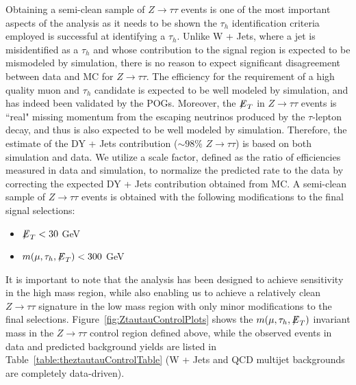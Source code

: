 Obtaining a semi-clean sample of $Z\to\tau\tau$ events is one of the most important aspects of the analysis as it needs to be shown the $\tau_{h}$ identification 
criteria employed is successful at identifying a $\tau_{h}$. Unlike W + Jets, where a jet is misidentified as a $\tau_{h}$ and whose contribution to the 
signal region is expected to be mismodeled by simulation, there is no reason to expect significant disagreement between data and MC for $Z\to\tau\tau$. The 
efficiency for the requirement of a high quality muon and $\tau_{h}$ candidate is expected to be well modeled by simulation, and has indeed been validated by the 
POGs. Moreover, the ${\not\mathrel{E}}_T$ in $Z\to\tau\tau$ events is ``real" missing momentum from the escaping neutrinos produced by the $\tau$-lepton decay, 
and thus is also expected to be well modeled by simulation. Therefore, the estimate of the DY + Jets contribution ($\sim 98$\% $Z\to\tau\tau$) is based on both 
simulation and data. We utilize a scale factor, defined as the ratio of efficiencies measured in data and simulation, to normalize the predicted rate 
to the data by correcting the expected DY + Jets contribution obtained from MC. A semi-clean sample of $Z \to \tau\tau$ events is obtained with the following 
modifications to the final signal selections:

\begin{itemize}
\item ${\not\mathrel{E}}_T < 30$ GeV 
\item $m(\mu,\tau_{h},{\not\mathrel{E}}_T) < 300$ GeV
\end{itemize}

It is important to note that the analysis has been designed to achieve sensitivity in the high mass region, while also enabling us to achieve a relatively clean 
$Z\rightarrow\tau\tau$ signature in the low mass region with only minor modifications to the final selections. Figure~\ref{fig:ZtautauControlPlots} shows the 
$m(\mu,\tau_{h},{\not\mathrel{E}}_T)$ invariant mass in the $Z\rightarrow\tau\tau$ control region defined above, while the observed events in data and predicted 
background yields are listed in Table~\ref{table:theztautauControlTable} (W + Jets and QCD multijet backgrounds are completely data-driven).

